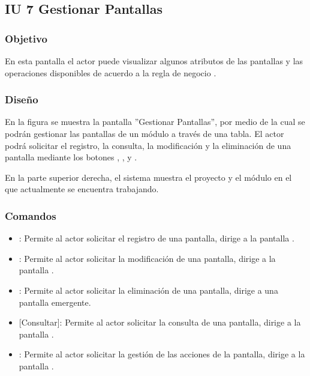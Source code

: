 \subsection{IU 7 Gestionar Pantallas}

\subsubsection{Objetivo}
	En esta pantalla el actor puede visualizar algunos atributos de las pantallas y las operaciones disponibles de acuerdo a la regla de negocio .
\subsubsection{Diseño}
	En la figura  se muestra la pantalla ''Gestionar Pantallas'', por medio de la cual se podrán gestionar las pantallas de un módulo a través de una tabla. El actor podrá solicitar el registro, la consulta, la modificación y la eliminación de una pantalla mediante los botones , , \editar y \eliminar.
	
	En la parte superior derecha, el sistema muestra el proyecto y el módulo en el que actualmente se encuentra trabajando.

\subsubsection{Comandos}
\begin{itemize}
	\item {}: Permite al actor solicitar el registro de una pantalla, dirige a la pantalla .
	\item \editar [Modificar]: Permite al actor solicitar la modificación de una pantalla, dirige a la pantalla .
	\item \eliminar [Eliminar]: Permite al actor solicitar la eliminación de una pantalla, dirige a una pantalla emergente.
	\item {} [Consultar]: Permite al actor solicitar la consulta de una pantalla, dirige a la pantalla  .
	\item {}: Permite al actor solicitar la gestión de las acciones de la pantalla, dirige a la pantalla .
\end{itemize}
